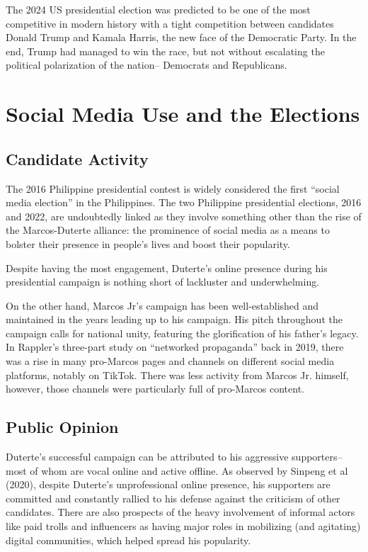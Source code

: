 The 2024 US presidential election was predicted to be one of the most competitive in modern history with a tight competition between candidates Donald Trump and Kamala Harris, the new face of the Democratic Party.\cite{RRL_Setiawan-2025} In the end, Trump had managed to win the race, but not without escalating the political polarization of the nation– Democrats and Republicans.\cite{RRL_Setiawan-2025}

\section{Social Media Use and the Elections}
\subsection{Candidate Activity}
The 2016 Philippine presidential contest is widely considered the first “social media election” in the Philippines.\cite{RRL_Sinpeng-2020} The two Philippine presidential elections, 2016 and 2022, are undoubtedly linked as they involve something other than the rise of the Marcos-Duterte alliance: the prominence of social media as a means to bolster their presence in people’s lives and boost their popularity.

Despite having the most engagement, Duterte’s online presence during his presidential campaign is nothing short of lackluster and underwhelming.\cite{RRL_Sinpeng-2020}

On the other hand, Marcos Jr’s campaign has been well-established and maintained in the years leading up to his campaign. His pitch throughout the campaign calls for national unity, featuring the glorification of his father’s legacy. In Rappler’s three-part study on “networked propaganda” back in 2019, there was a rise in many pro-Marcos pages and channels on different social media platforms, notably on TikTok. There was less activity from Marcos Jr. himself, however, those channels were particularly full of pro-Marcos content.\cite{RRL_Mendoza-2022}

\subsection{Public Opinion}
Duterte’s successful campaign can be attributed to his aggressive supporters– most of whom are vocal online and active offline. As observed by Sinpeng et al (2020), despite Duterte’s unprofessional online presence, his supporters are committed and constantly rallied to his defense against the criticism of other candidates.\cite{RRL_Sinpeng-2020} There are also prospects of the heavy involvement of informal actors like paid trolls and influencers as having major roles in mobilizing (and agitating) digital communities, which helped spread his popularity.\cite{RRL_Sinpeng-2020}

